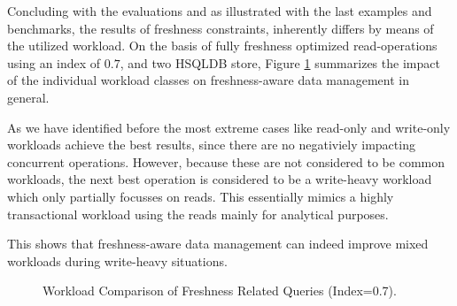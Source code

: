 
Concluding with the evaluations and as illustrated with the last examples and benchmarks, the results of freshness constraints, 
inherently differs by means of the utilized workload.
On the basis of fully freshness optimized read-operations using an index of $0.7$, and two HSQLDB store,
Figure \ref{fig:workload_comp} summarizes the impact of the individual workload classes on freshness-aware data management in general. 


As we have identified before the most extreme cases like read-only and write-only workloads achieve the best results,
since there are no negativiely impacting concurrent operations.
However, because these are not considered to be common workloads, the next best operation is considered to be a write-heavy workload 
which only partially focusses on reads.
This essentially mimics a highly transactional workload using the reads mainly for analytical purposes.


This shows that freshness-aware data management can indeed improve mixed workloads during write-heavy situations.

\begin{figure}[t] 
    \centering 
    \caption{Workload Comparison of Freshness Related Queries (Index=0.7).}
    \label{fig:workload_comp}
\end{figure}


